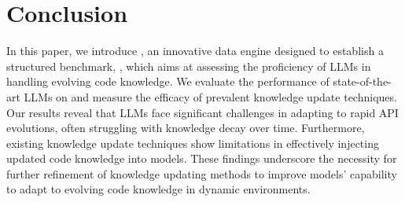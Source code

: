 \section{Conclusion}
In this paper, we introduce \method, an innovative data engine designed to establish a structured benchmark, \benchmark, which aims at assessing the proficiency of LLMs in handling evolving code knowledge. We evaluate the performance of state-of-the-art LLMs on \benchmark and measure the efficacy of prevalent knowledge update techniques.
Our results reveal that LLMs face significant challenges in adapting to rapid API evolutions, often struggling with knowledge decay over time. Furthermore, existing knowledge update techniques show limitations in effectively injecting updated code knowledge into models. These findings underscore the necessity for further refinement of knowledge updating methods to improve models' capability to adapt to evolving code knowledge in dynamic environments.
